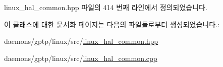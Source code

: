 linux\+\_\+hal\+\_\+common.\+hpp 파일의 414 번째 라인에서 정의되었습니다.



이 클래스에 대한 문서화 페이지는 다음의 파일들로부터 생성되었습니다.\+:\begin{DoxyCompactItemize}
\item 
daemons/gptp/linux/src/\hyperlink{linux__hal__common_8hpp}{linux\+\_\+hal\+\_\+common.\+hpp}\item 
daemons/gptp/linux/src/\hyperlink{linux__hal__common_8cpp}{linux\+\_\+hal\+\_\+common.\+cpp}\end{DoxyCompactItemize}
